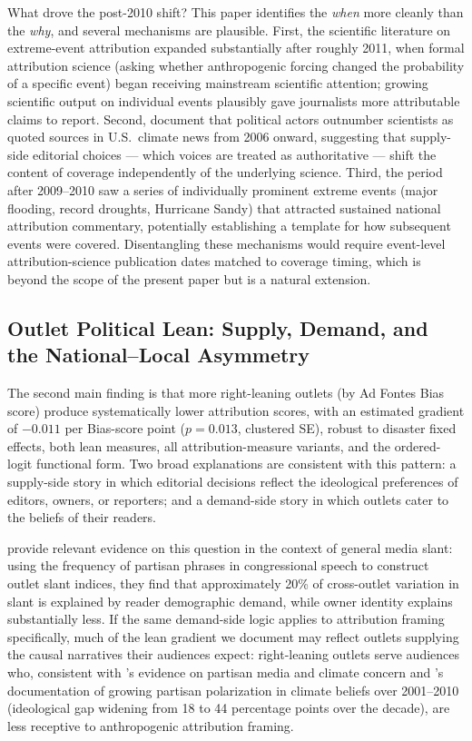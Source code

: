 \documentclass[12pt]{article}
\begin{document}
What drove the post-2010 shift?  This paper identifies the \emph{when}
more cleanly than the \emph{why}, and several mechanisms are plausible.
First, the scientific literature on extreme-event attribution expanded
substantially after roughly 2011, when formal attribution science
(asking whether anthropogenic forcing changed the probability of a
specific event) began receiving mainstream scientific attention; growing
scientific output on individual events plausibly gave journalists more
attributable claims to report.  Second, \citet{chinn2020} document that
political actors outnumber scientists as quoted sources in U.S.\ climate
news from 2006 onward, suggesting that supply-side editorial choices ---
which voices are treated as authoritative --- shift the content of
coverage independently of the underlying science.  Third, the period
after 2009--2010 saw a series of individually prominent extreme events
(major flooding, record droughts, Hurricane Sandy) that attracted
sustained national attribution commentary, potentially establishing a
template for how subsequent events were covered.  Disentangling these
mechanisms would require event-level attribution-science publication
dates matched to coverage timing, which is beyond the scope of the
present paper but is a natural extension.

\subsection*{Outlet Political Lean: Supply, Demand, and the
National--Local Asymmetry}

The second main finding is that more right-leaning outlets (by Ad
Fontes Bias score) produce systematically lower attribution scores,
with an estimated gradient of $-0.011$ per Bias-score point
($p=0.013$, clustered SE), robust to disaster fixed effects, both lean
measures, all attribution-measure variants, and the ordered-logit
functional form.  Two broad explanations are consistent with this
pattern: a supply-side story in which editorial decisions reflect the
ideological preferences of editors, owners, or reporters; and a
demand-side story in which outlets cater to the beliefs of their
readers.

\citet{gentzkow2010} provide relevant evidence on this question in the
context of general media slant: using the frequency of partisan phrases
in congressional speech to construct outlet slant indices, they find
that approximately 20\% of cross-outlet variation in slant is explained
by reader demographic demand, while owner identity explains
substantially less.  If the same demand-side logic applies to
attribution framing specifically, much of the lean gradient we document
may reflect outlets supplying the causal narratives their audiences
expect: right-leaning outlets serve audiences who, consistent with
\citet{carmichael2017}'s evidence on partisan media and climate concern
and \citet{mccright2011}'s documentation of growing partisan
polarization in climate beliefs over 2001--2010 (ideological gap
widening from 18 to 44 percentage points over the decade), are less
receptive to anthropogenic attribution framing.
\end{document}
